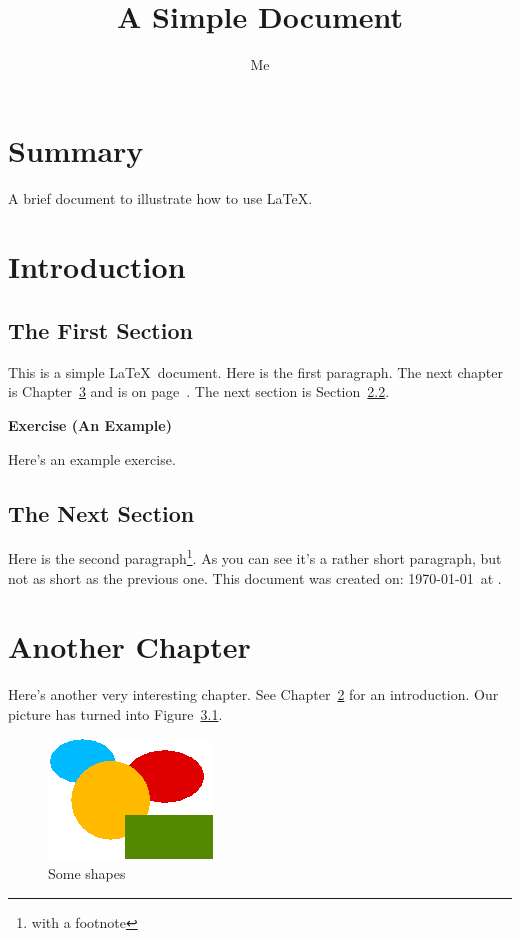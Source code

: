 \documentclass[12pt,captions=tableabove]{scrbook}
\title{A Simple Document}
\author{Me}
\newenvironment{exercise}[1]%
{%
  \par\vspace{\baselineskip}\noindent
  \textbf{Exercise (#1)}\begin{itshape}%
  \par\vspace{\baselineskip}\noindent\ignorespaces
}%
{%
  \end{itshape}\ignorespacesafterend
}
\begin{document}
\maketitle

\frontmatter
\tableofcontents
\listoffigures

\chapter{Summary}
A brief document to
illustrate how to use \LaTeX.

\mainmatter
\chapter{Introduction}
\label{ch:intro}

\section{The First Section}

This is a simple \LaTeX\ document.
Here is the first paragraph.
The next chapter is Chapter~\ref{ch:another}
and is on page~\pageref{ch:another}.
The next section is Section~\ref{sec:next}.

\begin{exercise}{An Example}
Here's an example exercise.
\end{exercise}

\section{The Next Section}
\label{sec:next}

Here is the second paragraph\footnote{with a footnote}. 
As you can see it's a rather short paragraph, but not 
as short as the previous one. This document was 
created on: \today\ at \currenttime.

\chapter{Another Chapter}
\label{ch:another}

Here's another very interesting chapter.
See Chapter~\ref{ch:intro} for an 
introduction. Our picture has turned
into Figure~\ref{fig:shapes}.

\begin{figure}[htbp]
\centering
 \includegraphics{shapes}
\caption{Some shapes}
\label{fig:shapes}
\end{figure}
\end{document}
